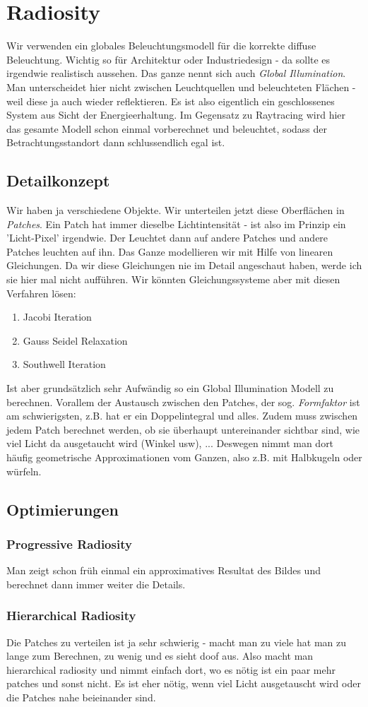\chapter{Radiosity}
Wir verwenden ein globales Beleuchtungsmodell für die korrekte diffuse Beleuchtung. Wichtig so für Architektur oder Industriedesign - da sollte es irgendwie realistisch aussehen. Das ganze nennt sich auch \textit{Global Illumination}. Man unterscheidet hier nicht zwischen Leuchtquellen und beleuchteten Flächen - weil diese ja auch wieder reflektieren. Es ist also eigentlich ein geschlossenes System aus Sicht der Energieerhaltung. Im Gegensatz zu Raytracing wird hier das gesamte Modell schon einmal vorberechnet und beleuchtet, sodass der Betrachtungsstandort dann schlussendlich egal ist.
\section{Detailkonzept}
Wir haben ja verschiedene Objekte. Wir unterteilen jetzt diese Oberflächen in \textit{Patches}. Ein Patch hat immer dieselbe Lichtintensität - ist also im Prinzip ein 'Licht-Pixel' irgendwie. Der Leuchtet dann auf andere Patches und andere Patches leuchten auf ihn. Das Ganze modellieren wir mit Hilfe von linearen Gleichungen. Da wir diese Gleichungen nie im Detail angeschaut haben, werde ich sie hier mal nicht aufführen. Wir könnten Gleichungssysteme aber mit diesen Verfahren lösen:
\begin{enumerate}
	\item Jacobi Iteration
	\item Gauss Seidel Relaxation
	\item Southwell Iteration
\end{enumerate}
Ist aber grundsätzlich sehr Aufwändig so ein Global Illumination Modell zu berechnen. Vorallem der Austausch zwischen den Patches, der sog. \textit{Formfaktor} ist am schwierigsten, z.B. hat er ein Doppelintegral und alles. Zudem muss zwischen jedem Patch berechnet werden, ob sie überhaupt untereinander sichtbar sind, wie viel Licht da ausgetaucht wird (Winkel usw), ... Deswegen nimmt man dort häufig geometrische Approximationen vom Ganzen, also z.B. mit Halbkugeln oder würfeln.

\section{Optimierungen}	
\subsection{Progressive Radiosity}
Man zeigt schon früh einmal ein approximatives Resultat des Bildes und berechnet dann immer weiter die Details.
\subsection{Hierarchical Radiosity}
Die Patches zu verteilen ist ja sehr schwierig - macht man zu viele hat man zu lange zum Berechnen, zu wenig und es sieht doof aus. Also macht man hierarchical radiosity und nimmt einfach dort, wo es nötig ist ein paar mehr patches und sonst nicht. Es ist eher nötig, wenn viel Licht ausgetauscht wird oder die Patches nahe beieinander sind.